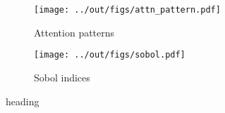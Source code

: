 \begin{figure}[t]
    \centering
    \begin{subfigure}[c]{0.55\textwidth}
        \texttt{[image: ../out/figs/attn\_pattern.pdf]}
        \caption{Attention patterns}
        \label{fig:attn-pattern}
    \end{subfigure}%
    \begin{subfigure}[c]{0.45\textwidth}
        \texttt{[image: ../out/figs/sobol.pdf]}
        \caption{Sobol indices}
        \label{fig:attn-sobol}
    \end{subfigure}
    \caption{heading}
    \label{fig:attn}
\end{figure}